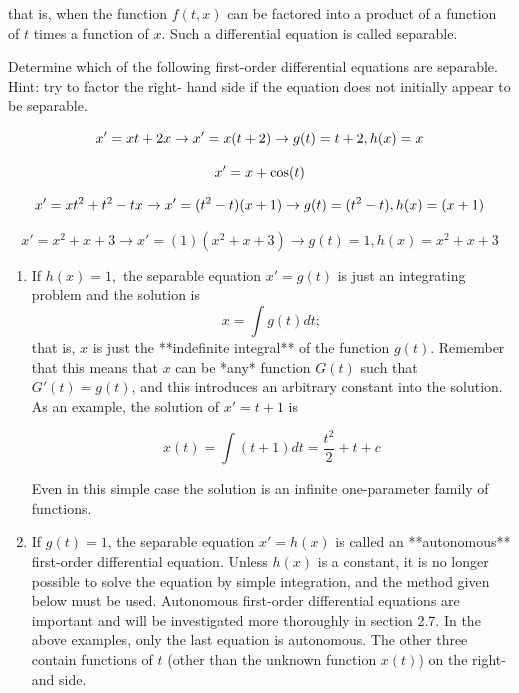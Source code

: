   that is, when the function $f(t, x)$ can be factored into a product of a function of $t$ times a function of $x$. Such a differential equation is called separable. 

  \begin{problem}
    Determine which of the following first-order differential equations are separable. Hint: try to factor the right- hand side if the equation does not initially appear to be separable.

    \begin{equation}
      x' = xt + 2x\to x' = x(t + 2)\to g(t) = t + 2,h(x) = x\\
    \end{equation}

    \begin{equation}
      x' = x + \cos (t)\\
    \end{equation}
    
    \begin{equation}
      x' = xt^2 + t^2 - tx\to x' =(t^2 - t)(x + 1)\to g(t) =(t^2 - t),h(x) =(x + 1)\\
    \end{equation}

    \begin{equation}
      x' = x^2 + x + 3\to x' = (1)(x^2 + x + 3)\to g(t) = 1,h(x) = x^2 + x + 3
    \end{equation}

    \begin{enumerate}
      \item 
        If $h(x) = 1,$ the separable equation $x'=g(t)$ is just an integrating problem and the solution is 
        \begin{equation}
          x=\int g(t)dt;
        \end{equation}
        that is, $x$ is just the **indefinite integral** of the function $g(t)$. Remember that this means that $x$ can be *any* function $G(t)$ such that $G'(t)=g(t)$, and this introduces an arbitrary constant into the solution. As an example, the solution of $x'=t+1$ is 

        \begin{equation}
          x(t)=\int(t+1)dt=\frac{t^2}{2}+t+ c
        \end{equation}

        Even in this simple case the solution is an infinite one-parameter family of functions.
      
      \item If $g(t)=1$, the separable equation $x'=h(x)$ is called an **autonomous** first-order differential equation. Unless $h(x)$ is a constant, it is no longer possible to solve the equation by simple integration, and the method given below must be used. Autonomous first-order differential equations are important and will be investigated more thoroughly in section 2.7. In the above examples, only the last equation is autonomous. The other three contain functions of $t$ (other than the unknown function $x(t)$) on the right-and side.
    \end{enumerate}
  \end{problem}

